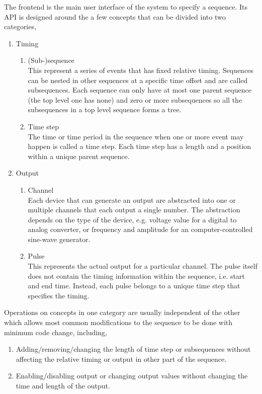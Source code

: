 The frontend is the main user interface of the system to specify a sequence.
Its API is designed around the a few concepts that can be divided into two categories,
\begin{enumerate}
\item Timing
  \begin{enumerate}
  \item (Sub-)sequence\\
    This represent a series of events that has fixed relative timing.
    Sequences can be nested in other sequences at a specific time offset
    and are called subsequences.
    Each sequence can only have at most one parent sequence (the top level one has none)
    and zero or more subsequences so all the subsequences in a top level sequence forms a tree.
  \item Time step\\
    The time or time period in the sequence when one or more event may happen
    is called a time step.
    Each time step has a length and a position within a unique parent sequence.
  \end{enumerate}
\item Output
  \begin{enumerate}
  \item Channel\\
    Each device that can generate an output are abstracted into
    one or multiple channels that each output a single number.
    The abstraction depends on the type of the device,
    e.g. voltage value for a digital to analog converter,
    or frequency and amplitude for an computer-controlled sine-wave generator.
  \item Pulse\\
    This represents the actual output for a particular channel.
    The pulse itself does not contain the timing information within the sequence,
    i.e. start and end time.
    Instead, each pulse belongs to a unique time step that specifies the timing.
  \end{enumerate}
\end{enumerate}
Operations on concepts in one category are usually independent of the other
which allows most common modifications to the sequence to be done
with minimum code change, including,
\begin{enumerate}
\item Adding/removing/changing the length of time step or subsequences
  without affecting the relative timing or output in other part of the sequence.
\item Enabling/disabling output or changing output values
  without changing the time and length of the output.
\end{enumerate}

